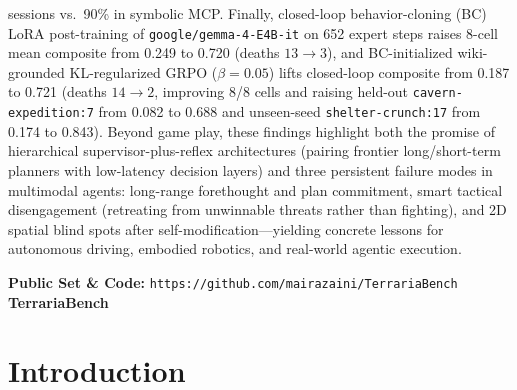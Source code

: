 \documentclass[10pt,letterpaper]{article}
\begin{document}
\begin{tcolorbox}[
  colback=sbgray,
  colframe=sbgray,
  arc=6pt,
  boxrule=0pt,
  left=18pt,
  right=18pt,
  top=18pt,
  bottom=16pt
]
sessions vs.\ 90\% in symbolic MCP. Finally, closed-loop behavior-cloning (BC) LoRA post-training of \texttt{google/gemma-4-E4B-it} on 652 expert steps raises 8-cell mean composite from 0.249 to 0.720 (deaths $13 \to 3$), and BC-initialized wiki-grounded KL-regularized GRPO ($\beta=0.05$) lifts closed-loop composite from 0.187 to 0.721 (deaths $14 \to 2$, improving 8/8 cells and raising held-out \texttt{cavern-expedition:7} from 0.082 to 0.688 and unseen-seed \texttt{shelter-crunch:17} from 0.174 to 0.843). Beyond game play, these findings highlight both the promise of hierarchical supervisor-plus-reflex architectures (pairing frontier long/short-term planners with low-latency decision layers) and three persistent failure modes in multimodal agents: long-range forethought and plan commitment, smart tactical disengagement (retreating from unwinnable threats rather than fighting), and 2D spatial blind spots after self-modification---yielding concrete lessons for autonomous driving, embodied robotics, and real-world agentic execution.

\vspace{10pt}
{\small\textbf{Public Set \& Code:} \texttt{https://github.com/mairazaini/TerrariaBench} \hfill \textbf{TerrariaBench}}
\end{tcolorbox}

\vspace{10pt}

\section{Introduction}
\end{document}
